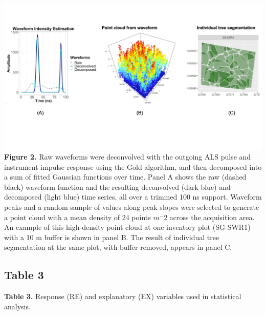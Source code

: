 \documentclass[
  12pt,
]{article}
\begin{document}
\includegraphics{./Figures/Fig2.png} \textbf{Figure 2.} Raw waveforms
were deconvolved with the outgoing ALS pulse and instrument impulse
response using the Gold algorithm, and then decomposed into a sum of
fitted Gaussian functions over time. Panel A shows the raw (dashed
black) waveform function and the resulting deconvolved (dark blue) and
decomposed (light blue) time series, all over a trimmed 100 ns support.
Waveform peaks and a random sample of values along peak slopes were
selected to generate a point cloud with a mean density of 24 points
\(m^-2\) across the acquisition area. An example of this high-density
point cloud at one inventory plot (SG-SWR1) with a 10 m buffer is shown
in panel B. The result of individual tree segmentation at the same plot,
with buffer removed, appears in panel C. \clearpage

\newpage

\subsection{Table 3}\label{table-3}

\textbf{Table 3.} Response (RE) and explanatory (EX) variables used in
statistical analysis.
\end{document}
